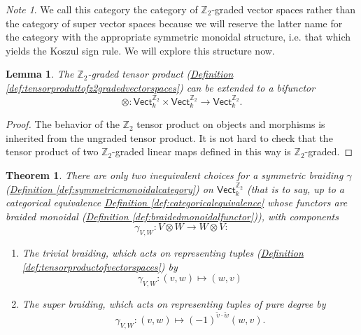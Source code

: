 \documentclass[a4paper,10pt]{scrreprt}
\newcommand{\Z}{\mathbb{Z}}
\theoremstyle{definition}
\theoremstyle{plain}
\newtheorem{theorem}{Theorem}[section]
\newtheorem{lemma}{Lemma}[section]
\theoremstyle{remark}
\newtheorem{note}{Note}[section]
\begin{document}
\begin{note}
  We call this category the category of $\Z_{2}$-graded vector spaces rather than the category of super vector spaces because we will reserve the latter name for the category with the appropriate symmetric monoidal structure, i.e. that which yields the Koszul sign rule. We will explore this structure now.
\end{note}

\begin{lemma}
  The $\Z_{2}$-graded tensor product (\hyperref[def:tensorproduttofz2gradedvectorspaces]{Definition \ref*{def:tensorproduttofz2gradedvectorspaces}}) can be extended to a bifunctor 
  \begin{equation*}
    \otimes\colon \mathsf{Vect}_k^{\Z_{2}} \times \mathsf{Vect}_k^{\Z_{2}} \to \mathsf{Vect}_k^{\Z_{2}}.
  \end{equation*}
\end{lemma}
\begin{proof}
  The behavior of the $\Z_{2}$ tensor product on objects and morphisms is inherited from the ungraded tensor product. It is not hard to check that the tensor product of two $\Z_{2}$-graded linear maps defined in this way is $\Z_{2}$-graded.
\end{proof}

\begin{theorem}
  There are only two inequivalent choices for a symmetric braiding $\gamma$ (\hyperref[def:symmetricmonoidalcategory]{Definition \ref*{def:symmetricmonoidalcategory}}) on $\mathsf{Vect}_{k}^{\Z_{2}}$ (that is to say, up to a categorical equivalence \hyperref[def:categoricalequivalence]{Definition \ref*{def:categoricalequivalence}} whose functors are braided monoidal (\hyperref[def:braidedmonoidalfunctor]{Definition \ref*{def:braidedmonoidalfunctor}})),  with components
  \begin{equation*}
    \gamma_{V,W}\colon V \otimes W \to W \otimes V:
  \end{equation*}

  \begin{enumerate}
    \item The \emph{trivial braiding}, which acts on representing tuples (\hyperref[def:tensorproductofvectorspaces]{Definition \ref*{def:tensorproductofvectorspaces}}) by 
      \begin{equation*}
        \gamma_{V, W}\colon (v, w) \mapsto (w, v)
      \end{equation*}

    \item The \emph{super braiding}, which acts on representing tuples of pure degree by
      \begin{equation*}
        \gamma_{V, W}\colon (v, w) \mapsto (-1)^{\tilde{v}\cdot \tilde{w}}(w, v).
      \end{equation*}
  \end{enumerate}
\end{theorem}
\end{document}

